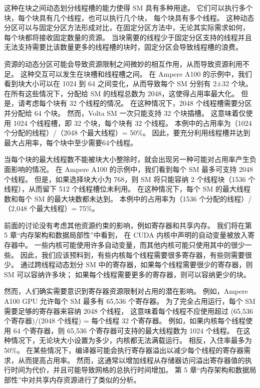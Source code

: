 这种在块之间动态划分线程槽的能力使得 SM 具有多种用途。 它们可以执行多个块，每个块具有几个线程，也可以执行几个块，
每个块具有多个线程。 这种动态分区可以与固定分区方法形成对比，在固定分区方法中，无论其实际需求如何，
每个块都将接收固定数量的资源。 当块需要的线程少于固定分区支持的线程并且无法支持需要比该数量更多的线程槽的块时，固定分区会导致线程槽的浪费。

资源的动态分区可能会导致资源限制之间微妙的相互作用，从而导致资源利用不足。 这种交互可以发生在块槽和线程槽之间。 
在 Ampere A100 的示例中，我们看到块大小可以在 1024 到 64 之间变化，从而导致每个 SM 分别有 2±32 个块。 
在所有这些情况下，分配给 SM 的线程总数为 2048，这使得占用率最大化。 但是，请考虑每个块有 32 个线程的情况。 
在这种情况下，2048 个线程槽需要分区并分配给 64 个块。 然而，Volta SM 一次只能支持 32 个块插槽。 
这意味着仅使用 1024 个线程槽，即 32 个块，每个块有 32 个线程。 
本例中的占用率为（1024 个分配的线程）/（2048 个最大线程）= 50\%。 
因此，要充分利用线程槽并达到最大占用率，每个块中至少需要64个线程。

当每个块的最大线程数不能被块大小整除时，就会出现另一种可能对占用率产生负面影响的情况。 
在 Ampere A100 的示例中，我们看到每个 SM 最多可支持 2048 个线程。 
但是，如果选择块大小为 768，则 SM 将只能容纳 2 个线程块（1536 个线程），从而留下 512 个线程槽位未利用。 
在这种情况下，每个 SM 的最大线程数和每个 SM 的最大块数都未达到。 
本例中的占用率为（1536 个分配的线程）/（2,048 个最大线程）= 75\%。

前面的讨论没有考虑其他资源约束的影响，例如寄存器和共享内存。 我们将在第 5 章“内存架构和数据局部性”中看到，
在 CUDA 内核中声明的自动变量被放入寄存器中。 一些内核可能使用许多自动变量，而其他内核可能只使用其中的很少一些。 
因此，我们应该预料到，有些内核每个线程需要很多寄存器，有些则需要很少。 
通过跨线程动态划分 SM 中的寄存器，如果每个线程需要很少的寄存器，则 SM 可以容纳许多块；
如果每个线程需要更多的寄存器，则可以容纳更少的块。

然而，人们确实需要意识到寄存器资源限制对占用的潜在影响。 例如，Ampere A100 GPU 允许每个 SM 最多有 65,536 个寄存器。 
为了完全占用运行，每个 SM 需要足够的寄存器来容纳 2048 个线程，
这意味着每个线程不应使用超过 (65,536 个寄存器)/(2048 个线程) = 每个线程 32 个寄存器。 
例如，如果内核每个线程使用 64 个寄存器，则 65,536 个寄存器可支持的最大线程数为 1024 个线程。 
在这种情况下，无论块大小设置为多少，内核都无法满载运行。 相反，入住率最多为50\%。 
在某些情况下，编译器可能会执行寄存器溢出以减少每个线程的寄存器需求，从而提高占用率。 
然而，这通常以增加线程从存储器访问溢出寄存器值的执行时间为代价，并且可能导致网格的总执行时间增加。 
第 5 章“内存架构和数据局部性”中对共享内存资源进行了类似的分析。

